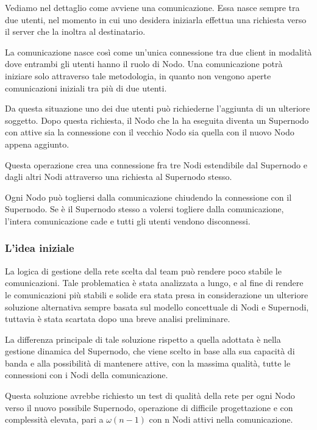 Vediamo nel dettaglio come avviene una comunicazione. Essa nasce sempre tra due utenti, nel momento in cui uno desidera iniziarla effettua una richiesta verso il server che la inoltra al destinatario.

La comunicazione nasce così come un'unica connessione tra due client in modalità \underline{} dove entrambi gli utenti hanno il ruolo di Nodo. Una comunicazione potrà iniziare solo attraverso tale metodologia, in quanto non vengono aperte comunicazioni iniziali tra più di due utenti.

Da questa situazione uno dei due utenti può richiederne l'aggiunta di un ulteriore soggetto. Dopo questa richiesta, il Nodo che la ha eseguita diventa un Supernodo con attive sia la connessione con il vecchio Nodo sia quella con il nuovo Nodo appena aggiunto.

Questa operazione crea una connessione fra tre Nodi estendibile dal Supernodo e dagli altri Nodi attraverso una richiesta al Supernodo stesso.


Ogni Nodo può togliersi dalla comunicazione chiudendo la connessione con il Supernodo. Se è il Supernodo stesso a volersi togliere dalla comunicazione, l'intera comunicazione cade e tutti gli utenti vendono disconnessi.

\subsubsection{L'idea iniziale}
La logica di gestione della rete scelta dal team può rendere poco stabile le comunicazioni. Tale problematica è stata analizzata a lungo, e al fine di rendere le comunicazioni più stabili e solide era stata presa in considerazione un ulteriore soluzione alternativa sempre basata sul modello concettuale di Nodi e Supernodi, tuttavia è stata scartata dopo una breve analisi preliminare.

La differenza principale di tale soluzione rispetto a quella adottata è nella gestione dinamica del Supernodo, che viene scelto in base alla sua capacità di banda e alla possibilità di mantenere attive, con la massima qualità, tutte le connessioni con i Nodi della comunicazione.

Questa soluzione avrebbe richiesto un test di qualità della rete per ogni Nodo verso il nuovo possibile Supernodo, operazione di difficile progettazione e con complessità elevata, pari a $\omega(n-1)$ con n Nodi attivi nella comunicazione.

